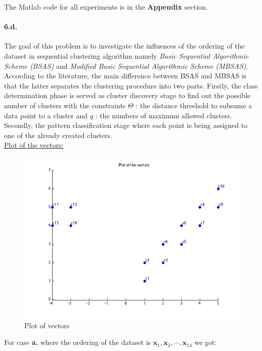 \documentclass[a4paper]{article}
\begin{document}
\setcounter{page}{6}

\noindent The Matlab code for all experiments is in the \textbf{Appendix} section.

\paragraph{6.d.} The goal of this problem is to investigate the influences of the ordering of the dataset in sequential clustering algorithm namely \emph{Basic Sequential Algorithmic Scheme (BSAS)} and \emph{Modified Basic Sequential Algorithmic Scheme (MBSAS)}. According to the literature, the main difference between BSAS and MBSAS is that the latter separates the clustering procedure into two parts. Firstly, the class determination phase is served as cluster discovery stage to find out the possible number of clusters with the constraints $\Theta$ : the distance threshold to subsume a data point to a cluster and $q$ : the numbers of maximum allowed clusters. Secondly, the pattern classification stage where each point is being assigned to one of the already created clusters. \\

	\underline{Plot of the vectors:}
	
	\begin{figure}[H]
	  \centering
	    \includegraphics[scale=.57]{images/vectors.png}
	  \caption{Plot of vectors}
	\end{figure}

	For case \textbf{a.} where the ordering of the dataset is $\mathbf{x}_1, \mathbf{x}_2,\cdots, \mathbf{x}_{14}$ we got:
	
\end{document}
